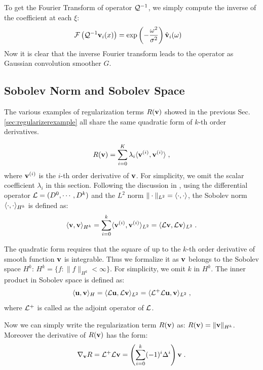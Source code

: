 \documentclass[letterpaper,12pt]{article}
\begin{document}
To get the Fourier Transform of operator $\mathcal{Q}^{-1}$, we simply compute the inverse of the coefficient at each $\xi$:
\begin{equation}
\begin{split}
\mathcal{F}\left( \mathcal{Q}^{-1} \mathbf{v}_i(x) \right) 
& =
\exp \left(
- \frac{\omega^2}{\sigma^2}
\right) \hat{\mathbf{v}}_i(\omega)
\end{split}
\end{equation}
Now it is clear that the inverse Fourier transform leads to the operator as Gaussian convolution smoother $G$.

\subsection{Sobolev Norm and Sobolev Space}

The various examples of regularization terms $R(\mathbf{v})$ showed in the previous Sec. \ref{sec:regularizerexample} all share the same quadratic form of $k$-th order derivatives. 

\begin{align}
R(\mathbf{v}) = \sum_{i=0}^K \lambda_i \langle \mathbf{v}^{(i)}, \mathbf{v}^{(i)} \rangle \;,
\end{align}
where $\mathbf{v}^{(i)}$ is the $i$-th order derivative of $\mathbf{v}$. For simplicity, we omit the scalar coefficient $\lambda_i$ in this section. Following the discussion in \cite{Zikic2010}, using the differential operator $\mathcal{L} = (D^0, \cdots, D^k)$ and the $L^2$ norm $\| \cdot \|_{L^2} = \langle \cdot, \cdot \rangle$, the Sobolev norm $\langle \cdot, \cdot \rangle_{H^k}$ is defined as: 
\begin{align}
\langle \mathbf{v}, \mathbf{v} \rangle_{H^k} = \sum_{i=0}^k \langle \mathbf{v}^{(i)}, \mathbf{v}^{(i)} \rangle_{L^2} = \langle \mathcal{L} \mathbf{v}, \mathcal{L} \mathbf{v} \rangle_{L^2} \;.
\end{align}

The quadratic form requires that the square of up to the $k$-th order derivative of smooth function $\mathbf{v}$ is integrable. Thus we formalize it as $\mathbf{v}$ belongs to the Sobolev space $H^k$:  $H^k = \{ f : \| f \|_{H^k} < \infty \}$. For simplicity, we omit $k$ in $H^k$. The inner product in Sobolev space is defined as:
\begin{align}
\langle \mathbf{u}, \mathbf{v} \rangle_H = \langle \mathcal{L}\mathbf{u}, \mathcal{L}\mathbf{v} \rangle_{L^2} = \langle \mathcal{L}^+\mathcal{L} \mathbf{u}, \mathbf{v} \rangle_{L^2} \;,
\end{align}
where $\mathcal{L}^+$ is called as the adjoint operator of $\mathcal{L}$.

Now we can simply write the regularization term $R(\mathbf{v})$ as: $R(\mathbf{v}) = \| \mathbf{v} \|_{H^k}$. Moreover the derivative of $R(\mathbf{v})$ has the form:
\begin{align}
\nabla_{\mathbf{v}} R = \mathcal{L}^+\mathcal{L} \mathbf{v} = \left ( \sum_{i=0}^k (-1)^i \Delta^i \right ) \mathbf{v}\;.
\end{align}
\end{document}
